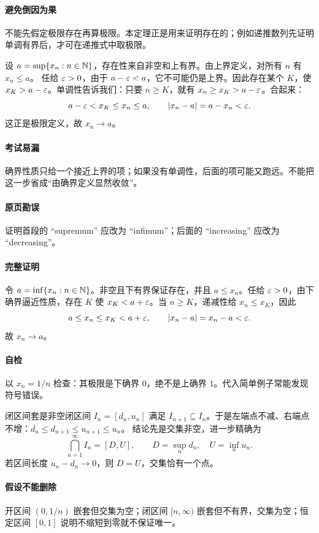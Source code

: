 \paragraph{避免倒因为果}不能先假定极限存在再算极限。本定理正是用来证明存在的；例如递推数列先证明单调有界后，才可在递推式中取极限。

设 $a=\sup\{x_n:n\in\mathbb{N}\}$，存在性来自非空和上有界。由上界定义，对所有 $n$ 有 $x_n\le a$。
任给 $\varepsilon>0$，由于 $a-\varepsilon<a$，它不可能仍是上界。因此存在某个 $K$，使 $x_K>a-\varepsilon$。单调性告诉我们：只要 $n\ge K$，就有 $x_n\ge x_K>a-\varepsilon$。合起来：
\[a-\varepsilon<x_K\le x_n\le a,\qquad |x_n-a|=a-x_n<\varepsilon.\]
这正是极限定义，故 $x_n\to a$。
\paragraph{考试易漏}确界性质只给一个接近上界的项；如果没有单调性，后面的项可能又跑远。不能把这一步省成“由确界定义显然收敛”。

\paragraph{原页勘误}证明首段的 ``supremum'' 应改为 ``infimum''；后面的 ``increasing'' 应改为 ``decreasing''。
\paragraph{完整证明}令 $a=\inf\{x_n:n\in\mathbb{N}\}$。非空且下有界保证存在，并且 $a\le x_n$。任给 $\varepsilon>0$，由下确界逼近性质，存在 $K$ 使 $x_K<a+\varepsilon$。当 $n\ge K$，递减性给 $x_n\le x_K$，因此
\[a\le x_n\le x_K<a+\varepsilon,\qquad |x_n-a|=x_n-a<\varepsilon.\]
故 $x_n\to a$。
\paragraph{自检}以 $x_n=1/n$ 检查：其极限是下确界 $0$，绝不是上确界 $1$。代入简单例子常能发现符号错误。

闭区间套是非空闭区间 $I_n=[d_n,u_n]$ 满足 $I_{n+1}\subseteq I_n$。于是左端点不减、右端点不增：$d_n\le d_{n+1}\le u_{n+1}\le u_n$。
结论先是交集非空，进一步精确为
\[\bigcap_{n=1}^{\infty}I_n=[D,U],\qquad D=\sup_n d_n,\quad U=\inf_n u_n.\]
若区间长度 $u_n-d_n\to0$，则 $D=U$，交集恰有一个点。
\paragraph{假设不能删除}开区间 $(0,1/n)$ 嵌套但交集为空；闭区间 $[n,\infty)$ 嵌套但不有界，交集为空；恒定区间 $[0,1]$ 说明不缩短到零就不保证唯一。

